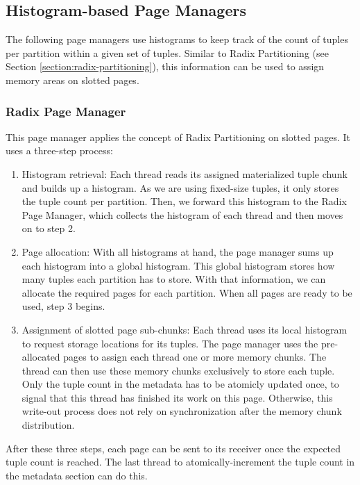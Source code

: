 \subsection{Histogram-based Page Managers}
The following page managers use histograms to keep track of the count of tuples per partition within a given set of tuples.
Similar to Radix Partitioning (see Section \ref{section:radix-partitioning}), this information can be used to assign memory areas on slotted pages.
\subsubsection{Radix Page Manager} \label{subsubsection-Radix-Page-Manager}
This page manager applies the concept of Radix Partitioning on slotted pages.
It uses a three-step process:
\begin{enumerate}
  \item Histogram retrieval: Each thread reads its assigned materialized tuple chunk and
        builds up a histogram.
        As we are using fixed-size tuples, it only stores the tuple count per partition.
        Then, we forward this histogram to the Radix Page Manager, which collects the histogram of each thread and then moves on to step 2.

  \item Page allocation: With all histograms at hand, the page manager sums up each
        histogram into a global histogram.
        This global histogram stores how many tuples each partition has to store.
        With that information, we can allocate the required pages for each partition.
        When all pages are ready to be used, step 3 begins.

  \item  Assignment of slotted page sub-chunks: Each thread uses its local histogram to
        request storage locations for its tuples.
        The page manager uses the pre-allocated pages to assign each thread one or more memory chunks.
        The thread can then use these memory chunks exclusively to store each tuple.
        Only the tuple count in the metadata has to be atomicly updated once, to signal that this thread has finished its work on this page.
        Otherwise, this write-out process does not rely on synchronization after the memory chunk distribution.
\end{enumerate}
After these three steps, each page can be sent to its receiver once the expected tuple count is reached.
The last thread to atomically-increment the tuple count in the metadata section can do this.

